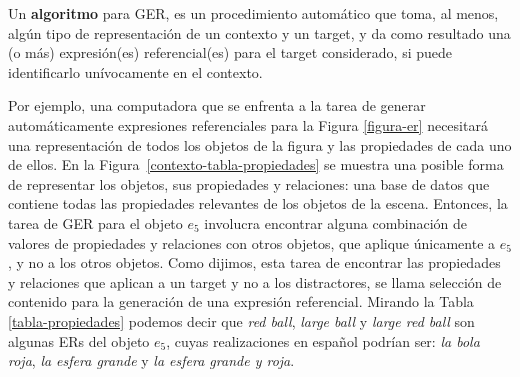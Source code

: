 Un {\bf algoritmo} para GER, es un procedimiento autom\'atico que toma, al menos, alg\'un tipo de representaci\'on de un contexto y un target, y da como resultado una (o m\'as) expresi\'on(es) referencial(es) para el target considerado, si puede identificarlo un\'ivocamente en el contexto.

Por ejemplo, una computadora que se enfrenta a la tarea de generar autom\'aticamente expresiones referenciales para la Figura \ref{figura-er} necesitar\'a una representaci\'on de todos los objetos de la figura y las propiedades de cada uno de ellos. En la Figura~\ref{contexto-tabla-propiedades} se muestra una posible forma de representar los objetos, sus propiedades y relaciones: una base de datos que contiene todas las propiedades relevantes de los objetos de la escena. Entonces, la tarea de GER para el objeto $e_5$ involucra encontrar alguna combinaci\'on de valores de propiedades y relaciones con otros objetos, que aplique \'unicamente a $e_5$, y no a los otros objetos. Como dijimos, esta tarea de encontrar las propiedades y relaciones que aplican a un target y no a los distractores, se llama selecci\'on de contenido para la generaci\'on de una expresi\'on referencial. Mirando la Tabla \ref{tabla-propiedades} podemos decir que {\it red ball}, {\it large ball} y {\it large red ball} son algunas ERs del objeto $e_5$, cuyas realizaciones en espa\~{n}ol podr\'ian ser: {\it la bola roja}, {\it la esfera grande} y {\it la esfera grande y roja}. 

